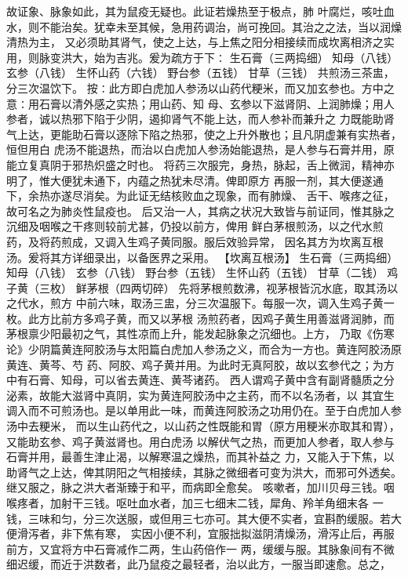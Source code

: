 \documentclass[a4paper,12pt,UTF8,twoside]{ctexbook}
\begin{document}
故证象、脉象如此，其为鼠疫无疑也。此证若燥热至于极点，肺 
叶腐烂，咳吐血水，则不能治矣。犹幸未至其候，急用药调治，尚可挽回。其治之之法，当以润燥清热为主， 
又必须助其肾气，使之上达，与上焦之阳分相接续而成坎离相济之实用，则脉变洪大，始为吉兆。爰为疏方于下∶ 
生石膏（三两捣细） 知母（八钱） 玄参（八钱） 生怀山药（六钱） 野台参（五钱） 甘草（三钱） 
共煎汤三茶盅，分三次温饮下。 
按∶此方即白虎加人参汤以山药代粳米，而又加玄参也。方中之意∶用石膏以清外感之实热；用山药、知 
母、玄参以下滋肾阴、上润肺燥；用人参者，诚以热邪下陷于少阴，遏抑肾气不能上达，而人参补而兼升之 
力既能助肾气上达，更能助石膏以逐除下陷之热邪，使之上升外散也；且凡阴虚兼有实热者，恒但用白 
虎汤不能退热，而治以白虎加人参汤始能退热，是人参与石膏并用，原能立复真阴于邪热炽盛之时也。 
将药三次服完，身热，脉起，舌上微润，精神亦明了，惟大便犹未通下，内蕴之热犹未尽清。俾即原方 
再服一剂，其大便遂通下，余热亦遂尽消矣。为此证无结核败血之现象，而有肺燥、 
舌干、喉疼之征，故可名之为肺炎性鼠疫也。 
后又治一人，其病之状况大致皆与前证同，惟其脉之沉细及咽喉之干疼则较前尤甚，仍投以前方，俾用 
鲜白茅根煎汤，以之代水煎药，及将药煎成，又调入生鸡子黄同服。服后效验异常， 
因名其方为坎离互根汤。爰将其方详细录出，以备医界之采用。 
【坎离互根汤】 
生石膏（三两捣细） 知母（八钱） 玄参（八钱） 野台参（五钱） 
生怀山药（五钱） 甘草（二钱） 鸡子黄（三枚） 鲜茅根（四两切碎） 
先将茅根煎数沸，视茅根皆沉水底，取其汤以之代水，煎方 
中前六味，取汤三盅，分三次温服下。每服一次，调入生鸡子黄一枚。此方比前方多鸡子黄，而又以茅根 
汤煎药者，因鸡子黄生用善滋肾润肺，而茅根禀少阳最初之气，其性凉而上升，能发起脉象之沉细也。上方， 
乃取《伤寒论》少阴篇黄连阿胶汤与太阳篇白虎加人参汤之义，而合为一方也。黄连阿胶汤原黄连、黄芩、芍 
药、阿胶、鸡子黄并用。为此时无真阿胶，故以玄参代之；为方中有石膏、知母，可以省去黄连、黄芩诸药。 
西人谓鸡子黄中含有副肾髓质之分泌素，故能大滋肾中真阴，实为黄连阿胶汤中之主药，而不以名汤者，以 
其宜生调入而不可煎汤也。是以单用此一味，而黄连阿胶汤之功用仍在。至于白虎加人参汤中去粳米， 
而以生山药代之，以山药之性既能和胃（原方用粳米亦取其和胃），又能助玄参、鸡子黄滋肾也。用白虎汤 
以解伏气之热，而更加人参者，取人参与石膏并用，最善生津止渴，以解寒温之燥热，而其补益之 
力，又能入于下焦，以助肾气之上达，俾其阴阳之气相接续，其脉之微细者可变为洪大，而邪可外透矣。 
继又服之，脉之洪大者渐臻于和平，而病即全愈矣。 
咳嗽者，加川贝母三钱。咽喉疼者，加射干三钱。呕吐血水者，加三七细末二钱，犀角、羚羊角细末各 
一钱，三味和匀，分三次送服，或但用三七亦可。其大便不实者，宜斟酌缓服。若大便滑泻者，非下焦有寒， 
实因小便不利，宜服拙拟滋阴清燥汤，滑泻止后，再服前方，又宜将方中石膏减作二两，生山药倍作一 
两，缓缓与服。其脉象间有不微细迟缓，而近于洪数者，此乃鼠疫之最轻者，治以此方，一服当即速愈。总之， 
\end{document}
